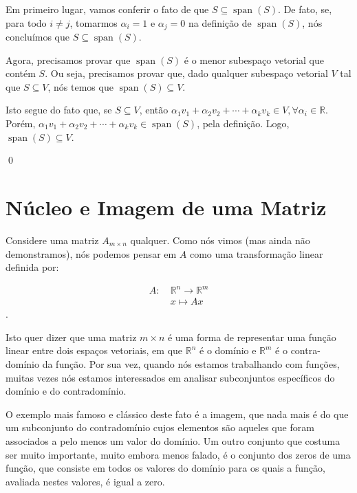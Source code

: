 \begin{Proof}
	Em primeiro lugar, vamos conferir o fato de que $S\subseteq\operatorname{span}(S)$. De fato, se, para todo $i\neq j$, tomarmos $\alpha_i = 1$ e $\alpha_j = 0$ na definição de $\operatorname{span}(S)$, nós concluímos que $S\subseteq\operatorname{span}(S)$.
	
	Agora, precisamos provar que $\operatorname{span}(S)$ é o menor subespaço vetorial que contém $S$. Ou seja, precisamos provar que, dado qualquer subespaço vetorial $V$ tal que $S\subseteq V$, nós temos que $\operatorname{span}(S)\subseteq V$.
	
	Isto segue do fato que, se $S\subseteq V$, então $\alpha_1v_1 + \alpha_2v_2 + \cdots + \alpha_kv_k\in V, \forall\alpha_i\in\mathbb{R}$. Porém, $\alpha_1v_1 + \alpha_2v_2 + \cdots + \alpha_kv_k\in\operatorname{span}(S)$, pela definição. Logo, $\operatorname{span}(S)\subseteq V$.
	
	\qed
\end{Proof}

\section{Núcleo e Imagem de uma Matriz}

Considere uma matriz $A_{m\times n}$ qualquer. Como nós vimos (mas ainda não demonstramos), nós podemos pensar em $A$ como uma transformação linear definida por:

\begin{align*}
	A:~&\mathbb{R}^n\to\mathbb{R}^m \\
	&x\mapsto Ax
\end{align*}.

Isto quer dizer que uma matriz $m\times n$ é uma forma de representar uma função linear entre dois espaços vetoriais, em que $\mathbb{R}^n$ é o domínio e $\mathbb{R}^m$ é o contra-domínio da função. Por sua vez, quando nós estamos trabalhando com funções, muitas vezes nós estamos interessados em analisar subconjuntos específicos do domínio e do contradomínio. 

O exemplo mais famoso e clássico deste fato é a imagem, que nada mais é do que um subconjunto do contradomínio cujos elementos são aqueles que foram associados a pelo menos um valor do domínio. Um outro conjunto que costuma ser muito importante, muito embora menos falado, é o conjunto dos zeros de uma função, que consiste em todos os valores do domínio para os quais a função, avaliada nestes valores, é igual a zero.

